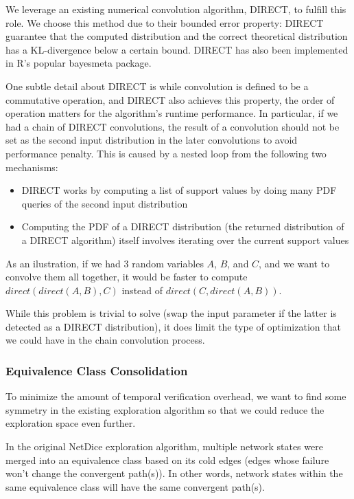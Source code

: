 \documentclass[10pt,sigconf,letterpaper,anonymous,nonacm]{acmart}
\begin{document}
We leverage an existing numerical convolution algorithm, DIRECT, to fulfill this role.
We choose this method due to their bounded error property: DIRECT guarantee that the computed 
distribution and the correct theoretical distribution has a KL-divergence below a certain bound.
DIRECT has also been implemented in R's popular bayesmeta package.

One subtle detail about DIRECT is while convolution is defined to be a commutative operation, and 
DIRECT also achieves this property, the order of operation matters for the algorithm's runtime 
performance.
In particular, if we had a chain of DIRECT convolutions, the result of a convolution should not be set 
as the second input distribution in the later convolutions to avoid performance penalty.
This is caused by a nested loop from the following two mechanisms:
\begin{itemize}
    \item DIRECT works by computing a list of support values by doing many PDF queries of the second input
        distribution
    \item Computing the PDF of a DIRECT distribution (the returned distribution of a DIRECT 
        algorithm) itself involves iterating over the current support values
\end{itemize}

As an ilustration, if we had 3 random variables $A$, $B$, and  $C$, and we want 
to convolve them all together, it would be faster to compute $direct(direct(A, B), C)$ instead of 
$direct(C, direct(A, B))$.

While this problem is trivial to solve (swap the input parameter if the latter is detected as a 
DIRECT distribution), it does limit the type of optimization that we could have in the chain convolution 
process.

\subsubsection{Equivalence Class Consolidation}
To minimize the amount of temporal verification overhead, we want to find some symmetry in the 
existing exploration algorithm so that we could reduce the exploration space even further.

In the original NetDice exploration algorithm, multiple network states were merged into an equivalence 
class based on its cold edges (edges whose failure won't change the convergent path(s)).
In other words, network states within the same equivalence class will have the same convergent path(s).
\end{document}
